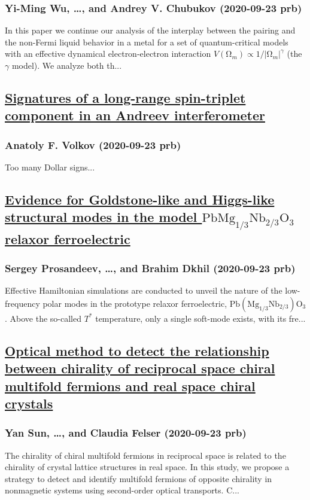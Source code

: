 \subsubsection*{Yi-Ming Wu, \dots, and Andrey V. Chubukov (2020-09-23 prb)}
In this paper we continue our analysis of the interplay between the pairing and the non-Fermi liquid behavior in a metal for a set of quantum-critical models with an effective dynamical electron-electron interaction $V({\mathrm{Ω}}_{m})∝1/{|{\mathrm{Ω}}_{m}|}^{γ}$ (the $γ$ model). We analyze both th...
\subsection*{\href{http://link.aps.org/doi/10.1103/PhysRevB.102.094517}{Signatures of a long-range spin-triplet component in an Andreev interferometer}}
\subsubsection*{Anatoly F. Volkov (2020-09-23 prb)}
Too many Dollar signs...
\subsection*{\href{http://link.aps.org/doi/10.1103/PhysRevB.102.104110}{Evidence for Goldstone-like and Higgs-like structural modes in the model $\mathrm{Pb}{\mathrm{Mg}}_{1/3}{\mathrm{Nb}}_{2/3}{\mathrm{O}}_{3}$ relaxor ferroelectric}}
\subsubsection*{Sergey Prosandeev, \dots, and Brahim Dkhil (2020-09-23 prb)}
Effective Hamiltonian simulations are conducted to unveil the nature of the low-frequency polar modes in the prototype relaxor ferroelectric, $\mathrm{Pb}({\mathrm{Mg}}_{1/3}{\mathrm{Nb}}_{2/3}){\mathrm{O}}_{3}$. Above the so-called ${T}^{*}$ temperature, only a single soft-mode exists, with its fre...
\subsection*{\href{http://link.aps.org/doi/10.1103/PhysRevB.102.104111}{Optical method to detect the relationship between chirality of reciprocal space chiral multifold fermions and real space chiral crystals}}
\subsubsection*{Yan Sun, \dots, and Claudia Felser (2020-09-23 prb)}
The chirality of chiral multifold fermions in reciprocal space is related to the chirality of crystal lattice structures in real space. In this study, we propose a strategy to detect and identify multifold fermions of opposite chirality in nonmagnetic systems using second-order optical transports. C...
